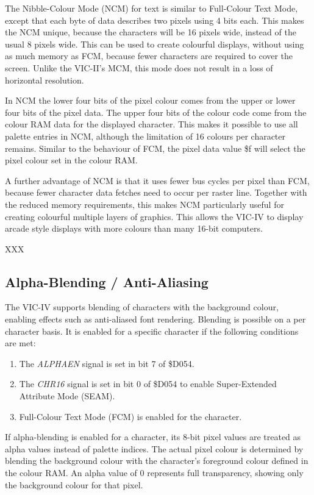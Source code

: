 The Nibble-Colour Mode (NCM) for text is similar to Full-Colour Text Mode, except that each byte of data describes two
pixels using 4 bits each. This makes the NCM unique, because the characters will be 16 pixels wide, instead of the usual 8 pixels wide. This can be used to create colourful displays, without using as much memory as FCM, because fewer characters are required to cover the screen.  Unlike the VIC-II's MCM, this mode does not result in a loss of horizontal resolution.

In NCM the lower four bits of the pixel colour comes from the upper or lower four bits of the pixel data.  The upper four bits of the colour code come from the colour RAM data for the displayed character.  This makes it possible to use all palette entries in NCM, although the limitation of 16 colours per character remains. Similar to the behaviour of FCM, the pixel data value \$f will select the pixel colour set in the colour RAM.

A further advantage of NCM is that it uses fewer bus cycles per pixel than FCM, because fewer character data fetches need to occur per raster line.  Together with the reduced memory requirements, this makes NCM particularly useful for creating colourful multiple layers of graphics.  This allows the VIC-IV to display arcade style displays with more colours than many 16-bit computers.


XXX

\subsection{Alpha-Blending / Anti-Aliasing}

The VIC-IV supports blending of characters with the background colour, enabling effects such as anti-aliased font rendering. Blending is possible on a per character basis. It is enabled for a specific character if the following conditions are met:
\begin{enumerate}
  \item The {\em ALPHAEN} signal is set in bit 7 of \$D054.
  \item The {\em CHR16} signal is set in bit 0 of \$D054 to enable Super-Extended Attribute Mode (SEAM).
  \item Full-Colour Text Mode (FCM) is enabled for the character.
\end{enumerate}
If alpha-blending is enabled for a character, its 8-bit pixel values are treated as alpha values instead of palette indices. The actual pixel colour is determined by blending the background colour with the character's foreground colour defined in the colour RAM. An alpha value of 0 represents full transparency, showing only the background colour for that pixel.

